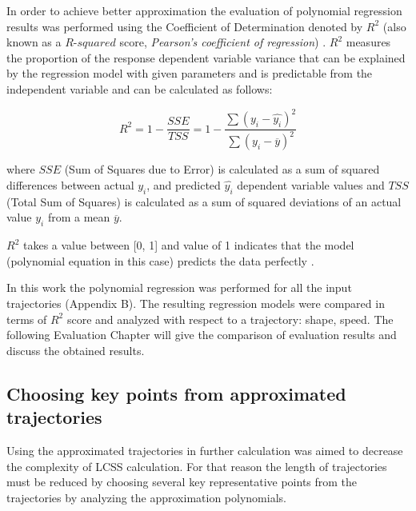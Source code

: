 In order to achieve better approximation the evaluation of polynomial regression results was performed using the Coefficient of Determination denoted by $R^2$ (also known as a $R$-$squared$ score, \textit{Pearson's coefficient of regression}) \cite{inbook:stats}. $R^2$ measures the proportion of the response dependent variable variance that can be explained by the regression model with given parameters and is predictable from the independent variable and can be calculated as follows: 

\begin{equation}\label{eq:r_sq}
	R^2 = 1 - \frac{SSE}{TSS} = 1 - \frac{\sum{(y_i - \hat{y_i})^2}}{\sum{(y_i - \overline{y})^2}}
\end{equation}

where $SSE$ (Sum of Squares due to Error) is calculated as a sum of squared differences between actual $y_i$, and predicted $\hat{y_i}$ dependent variable values and $TSS$ (Total Sum of Squares) is calculated as a sum of squared deviations of an actual value $y_i$ from a mean $\overline{y}$.

$R^2$ takes a value between [0, 1] and value of 1 indicates that the model (polynomial equation in this case) predicts the data perfectly \cite{online:reg_r_interpr}. 

In this work the polynomial regression was performed for all the input trajectories (Appendix B). The resulting regression models were compared in terms of $R^2$ score and analyzed with respect to a trajectory: shape, speed. The following Evaluation Chapter will give the comparison of evaluation results and discuss the obtained results.

\subsection{Choosing key points from approximated trajectories}

Using the approximated trajectories in further calculation was aimed to decrease the complexity of LCSS calculation. For that reason the length of trajectories must be reduced by choosing several key representative points from the trajectories by analyzing the approximation polynomials.


